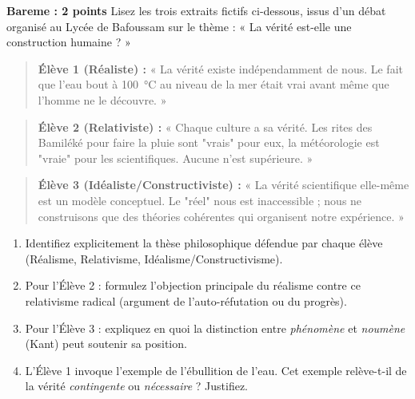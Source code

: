 \documentclass[11pt]{article}
\begin{document}
\begin{exercice}
\textbf{Bareme : 2 points}
Lisez les trois extraits fictifs ci-dessous, issus d'un débat organisé au Lycée de Bafoussam sur le thème : « La vérité est-elle une construction humaine ? »

\begin{quote}
\textbf{Élève 1 (Réaliste) :} « La vérité existe indépendamment de nous. Le fait que l'eau bout à \SI{100}{\celsius} au niveau de la mer était vrai avant même que l'homme ne le découvre. »
\end{quote}
\begin{quote}
\textbf{Élève 2 (Relativiste) :} « Chaque culture a sa vérité. Les rites des Bamiléké pour faire la pluie sont "vrais" pour eux, la météorologie est "vraie" pour les scientifiques. Aucune n'est supérieure. »
\end{quote}
\begin{quote}
\textbf{Élève 3 (Idéaliste/Constructiviste) :} « La vérité scientifique elle-même est un modèle conceptuel. Le "réel" nous est inaccessible ; nous ne construisons que des théories cohérentes qui organisent notre expérience. »
\end{quote}

\begin{enumerate}
    \item Identifiez explicitement la thèse philosophique défendue par chaque élève (Réalisme, Relativisme, Idéalisme/Constructivisme).
    \item Pour l'Élève 2 : formulez l'objection principale du réalisme contre ce relativisme radical (argument de l'auto-réfutation ou du progrès).
    \item Pour l'Élève 3 : expliquez en quoi la distinction entre \textit{phénomène} et \textit{noumène} (Kant) peut soutenir sa position.
    \item L'Élève 1 invoque l'exemple de l'ébullition de l'eau. Cet exemple relève-t-il de la vérité \textit{contingente} ou \textit{nécessaire} ? Justifiez.
\end{enumerate}
\end{exercice}
\end{document}
